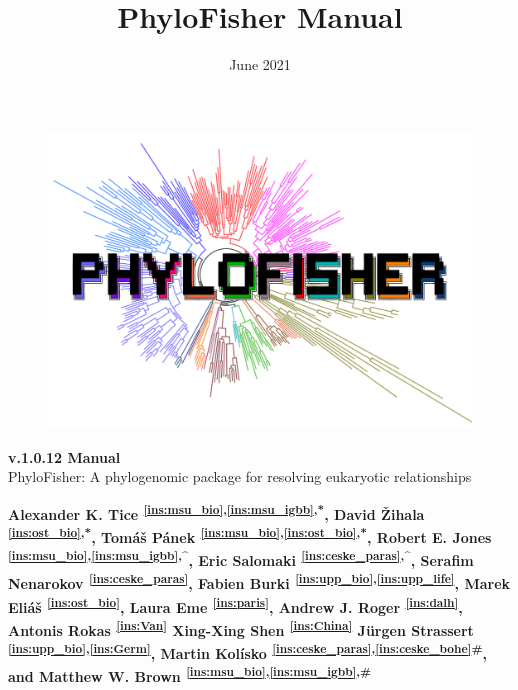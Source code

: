 \documentclass{article}
\title{PhyloFisher Manual}
\author{}
\date{June 2021}
\begin{document}
\begin{titlepage}
    \begin{center}
         \begin{figure}[H]
        	   \centering
        	    	\includegraphics[width=\linewidth]{figures/TREE-PF-LOGO.pdf}
            \end{figure}
        \textbf{v.1.0.12 Manual}\\
        PhyloFisher: A phylogenomic package for resolving eukaryotic relationships
        \vspace{0.2cm}
    \end{center}
        
        \textbf{Alexander K. Tice \textsuperscript{\ref{ins:msu_bio},\ref{ins:msu_igbb},*},
                David Žihala \textsuperscript{\ref{ins:ost_bio},*},
                Tomáš Pánek \textsuperscript{\ref{ins:msu_bio},\ref{ins:ost_bio},*},
                Robert E. Jones \textsuperscript{\ref{ins:msu_bio},\ref{ins:msu_igbb},\textasciicircum},
                Eric Salomaki \textsuperscript{\ref{ins:ceske_paras},\textasciicircum}, 
                Serafim Nenarokov \textsuperscript{\ref{ins:ceske_paras}}, 
                Fabien Burki \textsuperscript{\ref{ins:upp_bio},\ref{ins:upp_life}}, 
                Marek Eliáš \textsuperscript{\ref{ins:ost_bio}}, 
                Laura Eme \textsuperscript{\ref{ins:paris}}, 
                Andrew J. Roger \textsuperscript{\ref{ins:dalh}},
                Antonis Rokas \textsuperscript{\ref{ins:Van}}
                Xing-Xing Shen \textsuperscript{\ref{ins:China}}
                Jürgen Strassert \textsuperscript{\ref{ins:upp_bio},\ref{ins:Germ}}, 
                Martin Kolísko \textsuperscript{\ref{ins:ceske_paras},\ref{ins:ceske_bohe}\#}, 
                and 
                Matthew W. Brown \textsuperscript{\ref{ins:msu_bio},\ref{ins:msu_igbb},\#}}
        \vspace{0.15cm}
        

\end{titlepage}
\end{document}
